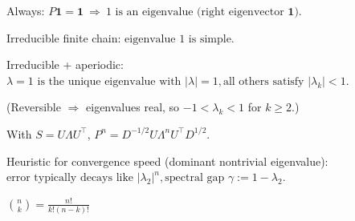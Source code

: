 \documentclass[a4paper, landscape]{article}
\newcommand{\subtopic}[1]{\par\textbf{#1}}
\renewcommand{\subtopic}[1]{\par\textbf{\color{blue}{#1}}} %
\begin{document}
\begin{multicols}{4}
\subtopic{Eigenvalue Facts for Stochastic $P$ (Finite)}
Always: $P\mathbf 1=\mathbf 1 \ \Rightarrow\ 1\text{ is an eigenvalue (right eigenvector }\mathbf 1).$

Irreducible finite chain: $\text{eigenvalue }1\text{ is simple.}$

Irreducible + aperiodic: $\lambda=1\text{ is the unique eigenvalue with }|\lambda|=1,
\text{all others satisfy }|\lambda_k|<1.$

(Reversible $\Rightarrow$ eigenvalues real, so $-1<\lambda_k<1$ for $k\ge2$.)

\subtopic{Spectral Decomposition of $P^n$ (Reversible)}
With $S=U\Lambda U^\top$, $P^n = D^{-1/2} U \Lambda^n U^\top D^{1/2}.$

Heuristic for convergence speed (dominant nontrivial eigenvalue): $\text{error typically decays like }|\lambda_2|^n,
\text{spectral gap } \gamma:=1-\lambda_2.$
\subtopic{Combinatoric:}
$\binom{n}{k}=\frac{n!}{k!(n-k)!}$

\vspace{60cm}






\end{multicols}
\end{document}
